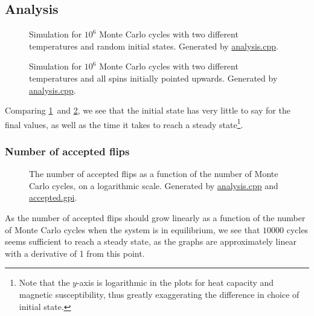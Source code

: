 \documentclass[12pt,english,a4paper]{article}
\newcommand{\program}[1]{\href{https://github.com/anjohan/Offentlig/blob/master/FYS3150/Oblig4/#1}{#1}}
\begin{document}
\subsection{Analysis}
\begin{figure}[H]
\centering
\caption{Simulation for \(10^6\) Monte Carlo cycles with two different temperatures and random initial states. Generated by \program{analysis.cpp}.}\label{2020random}
\end{figure}
\begin{figure}[H]
\centering
\caption{Simulation for \(10^6\) Monte Carlo cycles with two different temperatures and all spins initially pointed upwards. Generated by \program{analysis.cpp}.}\label{2020ordered}
\end{figure}
Comparing \ref{2020random} and \ref{2020ordered}, we see that the initial state has very little to say for the final values, as well as the time it takes to reach a steady state\footnote{Note that the \(y\)-axis is logarithmic in the plots for heat capacity and magnetic susceptibility, thus greatly exaggerating the difference in choice of initial state.}.

\subsubsection{Number of accepted flips}
\begin{figure}[H]
\centering

\caption{The number of accepted flips as a function of the number of Monte Carlo cycles, on a logarithmic scale. Generated by \program{analysis.cpp} and \program{accepted.gpi}.}\label{fig:accepted}
\end{figure}
As the number of accepted flips should grow linearly as a function of the number of Monte Carlo cycles when the system is in equilibrium, we see that \(\num{10000}\) cycles seems sufficient to reach a steady state, as the graphs are approximately linear with a derivative of 1 from this point.
\end{document}
